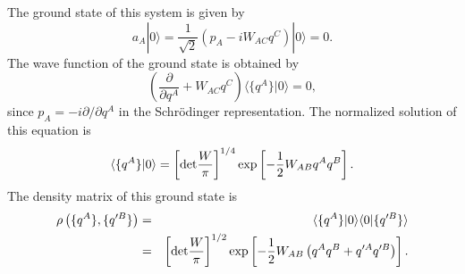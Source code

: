\documentclass[12pt,epsf]{article}
\begin{document}
The ground state of this system is given by
\begin{equation}
a_A|0\rangle=
\frac{1}{\sqrt{2}}\left(p_A-iW_{AC}q^C\right)|0\rangle=0.
\end{equation}
The wave function of the ground state is
obtained by
\begin{equation}
\left(\frac{\partial}{\partial q^A}+W_{AC}q^C\right)
   \langle\{q^A\}|0\rangle=0,
\end{equation}
since $p_A=-i\partial/\partial q^A$ in the
Schr\"odinger representation.
The normalized solution of this equation is
\begin{equation}
\langle\{q^A\}|0\rangle=\left[{\rm det}\frac{W}{\pi}\right]^{1/4}
  \exp\left[-\frac{1}{2}W_{AB}q^Aq^B\right].
\end{equation}
The density matrix of this ground state is
\begin{eqnarray}
 \rho\left(\{q^A\},\{q'^B\}\right)
  &=& \langle\{q^A\}|0\rangle \langle0|\{q'^B\}\rangle\\
  &=& \left[{\rm det}\frac{W}{\pi}\right]^{1/2}
       \exp\left[-\frac{1}{2}W_{AB}
        \left(q^Aq^B+q'^Aq'^B\right)\right].
\end{eqnarray}
\end{document}
